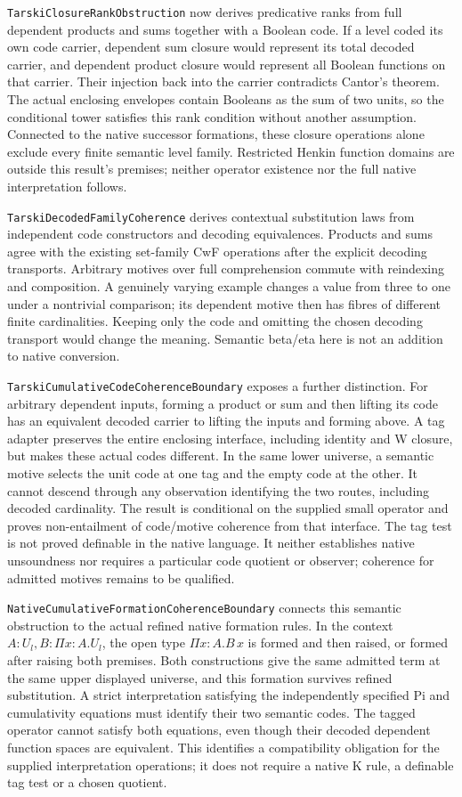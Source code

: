 \documentclass[11pt]{article}
\theoremstyle{definition}
\theoremstyle{remark}
\begin{document}
\nolinkurl{TarskiClosureRankObstruction} now derives predicative ranks from
full dependent products and sums together with a Boolean code. If a level
coded its own code carrier, dependent sum closure would represent its total
decoded carrier, and dependent product closure would represent all Boolean
functions on that carrier. Their injection back into the carrier contradicts
Cantor's theorem. The actual enclosing envelopes contain Booleans as the sum
of two units, so the conditional tower satisfies this rank condition without
another assumption. Connected to the native successor formations, these
closure operations alone exclude every finite semantic level family.
Restricted Henkin function domains are outside this result's premises;
neither operator existence nor the full native interpretation follows.

\nolinkurl{TarskiDecodedFamilyCoherence} derives contextual substitution
laws from independent code constructors and decoding equivalences.
Products and sums agree with the existing set-family CwF operations after
the explicit decoding transports. Arbitrary motives over full comprehension
commute with reindexing and composition. A genuinely varying example changes
a value from three to one under a nontrivial comparison; its dependent motive
then has fibres of different finite cardinalities. Keeping only the code and
omitting the chosen decoding transport would change the meaning. Semantic
beta/eta here is not an addition to native conversion.

\nolinkurl{TarskiCumulativeCodeCoherenceBoundary} exposes a further distinction.
For arbitrary dependent inputs, forming a product or sum and then lifting
its code has an equivalent decoded carrier to lifting the inputs and forming
above. A tag adapter preserves the entire enclosing interface, including
identity and W closure, but makes these actual codes different. In the same
lower universe, a semantic motive selects the unit code at one tag and the
empty code at the other. It cannot descend through any observation identifying
the two routes, including decoded cardinality. The result is conditional on
the supplied small operator and proves non-entailment of code/motive
coherence from that interface. The tag test is not proved definable in the
native language. It neither establishes native unsoundness nor requires a
particular code quotient or observer; coherence for admitted motives remains
to be qualified.

\nolinkurl{NativeCumulativeFormationCoherenceBoundary} connects this semantic
obstruction to the actual refined native formation rules. In the context
\(A:U_l, B:\Pi x:A.U_l\), the open type \(\Pi x:A.B\,x\) is formed and
then raised, or formed after raising both premises. Both constructions give
the same admitted term at the same upper displayed universe, and this
formation survives refined substitution. A strict interpretation satisfying
the independently specified Pi and cumulativity equations must identify their
two semantic codes. The tagged operator cannot satisfy both equations, even
though their decoded dependent function spaces are equivalent. This identifies
a compatibility obligation for the supplied interpretation operations; it
does not require a native K rule, a definable tag test or a chosen quotient.
\end{document}
